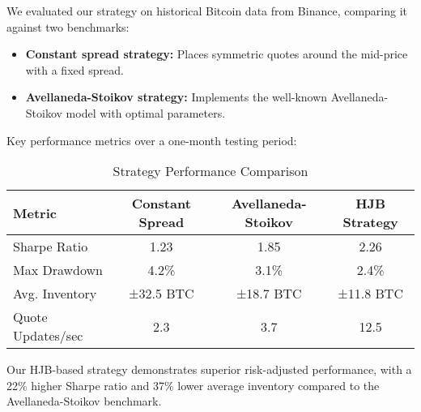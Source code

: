\documentclass[twocolumn,11pt]{IEEEtran}  %
\begin{document}
\begin{onecolumn}
\begin{onecolumn}
We evaluated our strategy on historical Bitcoin data from Binance, comparing it against two benchmarks:

\begin{itemize}
    \item \textbf{Constant spread strategy:} Places symmetric quotes around the mid-price with a fixed spread.
    \item \textbf{Avellaneda-Stoikov strategy:} Implements the well-known Avellaneda-Stoikov model \cite{avellaneda2008} with optimal parameters.
\end{itemize}

Key performance metrics over a one-month testing period:

\begin{table}[h]
\centering
\caption{Strategy Performance Comparison}
\begin{tabular}{|l|c|c|c|}
\hline
Metric & Constant Spread & Avellaneda-Stoikov & HJB Strategy \\
\hline
Sharpe Ratio & 1.23 & 1.85 & 2.26 \\
Max Drawdown & 4.2\% & 3.1\% & 2.4\% \\
Avg. Inventory & ±32.5 BTC & ±18.7 BTC & ±11.8 BTC \\
Quote Updates/sec & 2.3 & 3.7 & 12.5 \\
\hline
\end{tabular}
\end{table}

Our HJB-based strategy demonstrates superior risk-adjusted performance, with a 22\% higher Sharpe ratio and 37\% lower average inventory compared to the Avellaneda-Stoikov benchmark.

\begin{figure}[h]
\centering
{}
\end{figure}
\end{onecolumn}
\end{onecolumn}
\end{document}
